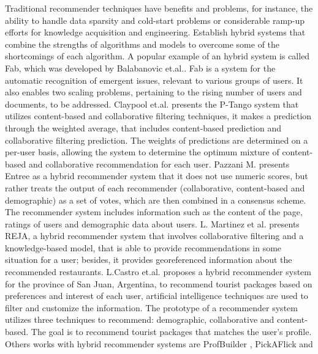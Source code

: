 Traditional recommender techniques have benefits and problems, for
instance, the ability to handle data sparsity and cold-start problems
or considerable ramp-up efforts for knowledge acquisition and
engineering. Establish hybrid systems that combine the strengths of
algorithms and models to overcome some of the shortcomings of
each algorithm.
A popular example of an hybrid system is called Fab, which was developed by 
Balabanovic et.al.\cite{balabanovic1997fab}. Fab is a system 
for the automatic recognition of emergent issues, relevant to various 
groups of users. It also enables two scaling problems, 
pertaining to the rising number of users and documents, to be addressed. 
Claypool et.al.\cite{claypool1999combining} 
presents the P-Tango system that utilizes content-based and collaborative
filtering techniques, it makes a prediction through the weighted
average, that includes content-based prediction and collaborative
filtering prediction. The weights of predictions are determined on a
per-user basis, allowing the system to determine the optimum mixture
of content-based and collaborative recommendation for each user.
Pazzani M.\cite{pazzani1999framework} presents Entree as a hybrid
recommender system that it does not use numeric scores, but rather
treats the output of each recommender (collaborative, content-based
and demographic) as a set of votes, which are then combined in a
consensus scheme. The recommender system includes information such as
the content of the page, ratings of users and demographic data about
users. 
L. Martinez et al.\cite{martinez2009reja} presents REJA, a hybrid
recommender system that involves collaborative filtering and a
knowledge-based model, that is able to provide recommendations in some
situation for a user; besides, it provides georeferenced information
about the recommended restaurants.
L.Castro et.al.\cite{castro2012prototype} proposes  
a hybrid recommender system for the province of San Juan, Argentina, 
to recommend tourist packages  based on preferences and interest 
of each user, artificial intelligence
techniques are used to filter and customize the information. The
prototype of a recommender system utilizes three techniques to
recommend: demographic, collaborative and content-based. The goal is
to recommend tourist packages that matches the user's profile.
Others works with hybrid recommender systems are ProfBuilder
\cite{al1999semantic}, PickAFlick\cite{burke1999integrating}  and
